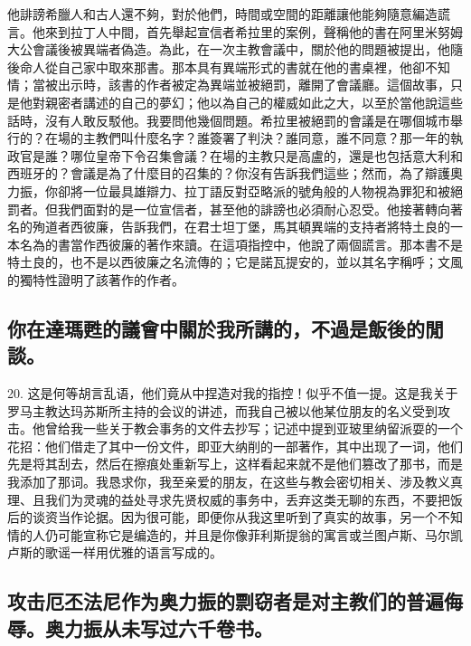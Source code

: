 他誹謗希臘人和古人還不夠，對於他們，時間或空間的距離讓他能夠隨意編造謊言。他來到拉丁人中間，首先舉起宣信者希拉里的案例，聲稱他的書在阿里米努姆大公會議後被異端者偽造。為此，在一次主教會議中，關於他的問題被提出，他隨後命人從自己家中取來那書。那本具有異端形式的書就在他的書桌裡，他卻不知情；當被出示時，該書的作者被定為異端並被絕罰，離開了會議廳。這個故事，只是他對親密者講述的自己的夢幻；他以為自己的權威如此之大，以至於當他說這些話時，沒有人敢反駁他。我要問他幾個問題。希拉里被絕罰的會議是在哪個城市舉行的？在場的主教們叫什麼名字？誰簽署了判決？誰同意，誰不同意？那一年的執政官是誰？哪位皇帝下令召集會議？在場的主教只是高盧的，還是也包括意大利和西班牙的？會議是為了什麼目的召集的？你沒有告訴我們這些；然而，為了辯護奧力振，你卻將一位最具雄辯力、拉丁語反對亞略派的號角般的人物視為罪犯和被絕罰者。但我們面對的是一位宣信者，甚至他的誹謗也必須耐心忍受。他接著轉向著名的殉道者西彼廉，告訴我們，在君士坦丁堡，馬其頓異端的支持者將特土良的一本名為的書當作西彼廉的著作來讀。在這項指控中，他說了兩個謊言。那本書不是特土良的，也不是以西彼廉之名流傳的；它是諾瓦提安的，並以其名字稱呼；文風的獨特性證明了該著作的作者。\par


\subsection{你在達瑪甦的議會中關於我所講的，不過是飯後的閒談。}

20. 这是何等胡言乱语，他们竟从中捏造对我的指控！似乎不值一提。这是我关于罗马主教达玛苏斯所主持的会议的讲述，而我自己被以他某位朋友的名义受到攻击。他曾给我一些关于教会事务的文件去抄写；记述中提到亚玻里纳留派耍的一个花招：他们借走了其中一份文件，即亚大纳削的一部著作，其中出现了一词，他们先是将其刮去，然后在擦痕处重新写上，这样看起来就不是他们篡改了那书，而是我添加了那词。我恳求你，我至亲爱的朋友，在这些与教会密切相关、涉及教义真理、且我们为灵魂的益处寻求先贤权威的事务中，丢弃这类无聊的东西，不要把饭后的谈资当作论据。因为很可能，即便你从我这里听到了真实的故事，另一个不知情的人仍可能宣称它是编造的，并且是你像菲利斯提翁的寓言或兰图卢斯、马尔凯卢斯的歌谣一样用优雅的语言写成的。\par


\subsection{攻击厄丕法尼作为奥力振的剽窃者是对主教们的普遍侮辱。奥力振从未写过六千卷书。}

